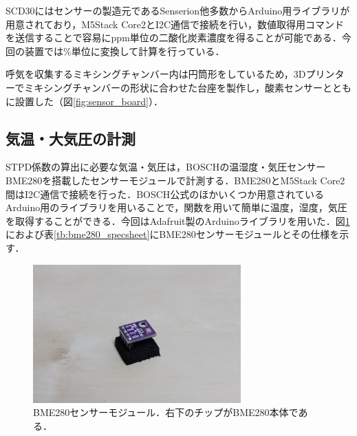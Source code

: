 SCD30にはセンサーの製造元であるSenserion他多数からArduino用ライブラリが用意されており，M5Stack Core2とI2C通信で接続を行い，数値取得用コマンドを送信することで容易にppm単位の二酸化炭素濃度を得ることが可能である．今回の装置では\%単位に変換して計算を行っている．

呼気を収集するミキシングチャンバー内は円筒形をしているため，3Dプリンターでミキシングチャンバーの形状に合わせた台座を製作し，酸素センサーとともに設置した（図\ref{fig:sensor_board}）．





\subsection{気温・大気圧の計測}
\label{sec:measuring_ambient}

STPD係数の算出に必要な気温・気圧は，BOSCHの温湿度・気圧センサーBME280を搭載したセンサーモジュールで計測する．BME280とM5Stack Core2間はI2C通信で接続を行った．BOSCH公式のほかいくつか用意されているArduino用のライブラリを用いることで，関数を用いて簡単に温度，湿度，気圧を取得することができる．今回はAdafruit製のArduinoライブラリを用いた．図\ref{fig:bme280}におよび表\ref{tb:bme280_specsheet}にBME280センサーモジュールとその仕様を示す．

\begin{figure}[H]
  \begin{center}
    \includegraphics[width=8cm]{fig/bme280}
    \caption{BME280センサーモジュール．右下のチップがBME280本体である．}
    \label{fig:bme280}
  \end{center}
\end{figure}

